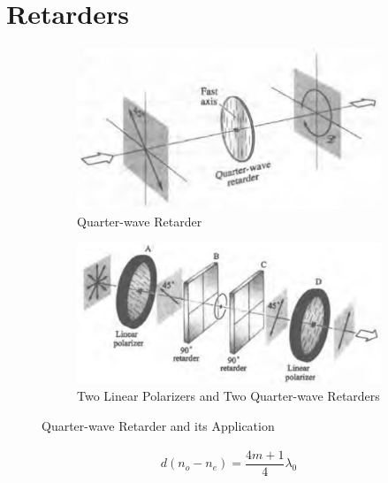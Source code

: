 \section{Retarders}

\begin{figure}[H]
  \centering
  \begin{subfigure}{.5\textwidth}
    \centering
    \includegraphics[width=0.8\linewidth]{figures/Retarder}
    \caption{Quarter-wave Retarder}
    \label{fig:}
  \end{subfigure}%
  \begin{subfigure}{.5\textwidth}
    \centering
    \includegraphics[width=0.9\linewidth]{figures/Retarder2}
    \caption{Two Linear Polarizers and Two Quarter-wave Retarders}
    \label{fig:}
  \end{subfigure}
  \label{fig:}
  \caption{Quarter-wave Retarder and its Application}
\end{figure}

\begin{equation*}
  \begin{aligned}
    d \left( n_o - n_e \right) = \dfrac{4 m + 1}{4} \lambda_0 
  \end{aligned}
\end{equation*}


